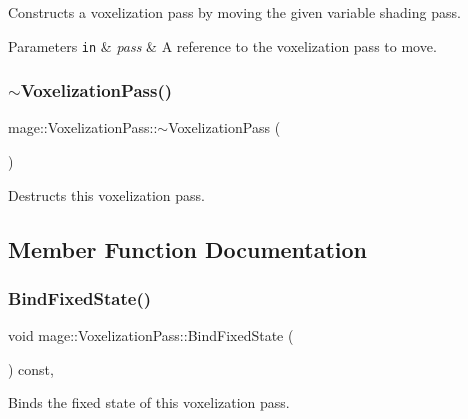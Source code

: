 Constructs a voxelization pass by moving the given variable shading pass.


\begin{DoxyParams}[1]{Parameters}
\mbox{\tt in}  & {\em pass} & A reference to the voxelization pass to move. \\
\hline
\end{DoxyParams}
\hypertarget{classmage_1_1_voxelization_pass_adc6aeb1a2e0709f5900fbc0ebaa163e3}{}\label{classmage_1_1_voxelization_pass_adc6aeb1a2e0709f5900fbc0ebaa163e3} 
\subsubsection{\texorpdfstring{$\sim$\+Voxelization\+Pass()}{~VoxelizationPass()}}
{\footnotesize\ttfamily mage\+::\+Voxelization\+Pass\+::$\sim$\+Voxelization\+Pass (\begin{DoxyParamCaption}{ }\end{DoxyParamCaption})\hspace{0.3cm}{\ttfamily [default]}}

Destructs this voxelization pass. 

\subsection{Member Function Documentation}
\hypertarget{classmage_1_1_voxelization_pass_ae91349cb63c302c256c822cfd69c42e8}{}\label{classmage_1_1_voxelization_pass_ae91349cb63c302c256c822cfd69c42e8} 
\subsubsection{\texorpdfstring{Bind\+Fixed\+State()}{BindFixedState()}}
{\footnotesize\ttfamily void mage\+::\+Voxelization\+Pass\+::\+Bind\+Fixed\+State (\begin{DoxyParamCaption}{ }\end{DoxyParamCaption}) const\hspace{0.3cm}{\ttfamily [private]}, {\ttfamily [noexcept]}}

Binds the fixed state of this voxelization pass. \hypertarget{classmage_1_1_voxelization_pass_a7c49d59653daa9a205b13de23727b3d6}{}\label{classmage_1_1_voxelization_pass_a7c49d59653daa9a205b13de23727b3d6} 
